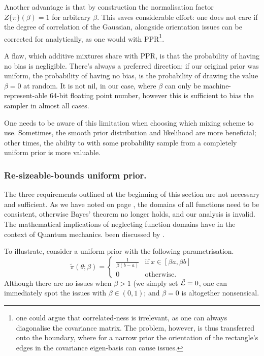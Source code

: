 \documentclass[usenatbib]{mnras}
\begin{document}
Another advantage is that by construction the normalisation
factor \(Z \{ \pi\}(\beta) = 1\) for arbitrary \(\beta\). This
saves considerable effort: one does not care if the degree of correlation
of the Gaussian, alongside orientation issues can be corrected
for analytically, as one would with PPR\footnote{one could argue
that correlated-ness is irrelevant, as one can always
diagonalise the covariance matrix. The problem, however, is
thus transferred onto the boundary, where for a narrow prior
the orientation of the rectangle's edges in the covariance
eigen-basis can cause issues.}.

A flaw, which additive mixtures share with PPR, is that the
probability of having no bias is negligible. There's always a
preferred direction: if our original prior was uniform, the
probability of having no bias, is the probability of drawing the
value \(\beta=0\) at random. It is not nil, in our case, where
\(\beta\) can only be machine-represent-able 64-bit floating point
number, however this is sufficient to bias the sampler in almost
all cases.

One needs to be aware of this limitation when choosing which
mixing scheme to use. Sometimes, the smooth prior distribution and
likelihood are more beneficial; other times, the ability to with
some probability sample from a completely uniform prior is more
valuable. 

\subsubsection{Re-sizeable-bounds uniform prior.}
\label{sec:orgb81a175}

The three requirements outlined at the beginning of this section
are not necessary and sufficient. As we have noted on page
\pageref{domain-discussion}, the domains of all functions need to be
consistent, otherwise Bayes' theorem no longer holds, and our
analysis is invalid. The mathematical implications of neglecting
function domains have in the context of Quantum mechanics. been
discussed by \cite{Gieres_2000}.

To illustrate, consider a uniform prior with the following
parametrisation.
\begin{equation}
  \tilde{\pi}(\theta; \beta) =
  \begin{cases}
	\frac{1}{\beta(b-a)} & \text{if}\ x \in [\beta a, \beta b] \\
	0 & \text{otherwise}.
  \end{cases}
\end{equation}
Although there are no issues when \(\beta>1\) (we simply set \({\cal
	\tilde{L}}=0\), one can immediately spot the issues with \(\beta \in (0,1)\);
and \(\beta=0\) is altogether nonsensical.
\end{document}
